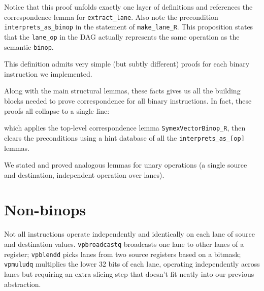 Notice that this proof unfolds exactly one layer of definitions and references the correspondence lemma for \texttt{extract_lane}. 
Also note the precondition \texttt{interprets_as_binop} in the statement of \texttt{make_lane_R}. This proposition states that the \texttt{lane_op} in the DAG actually represents the same operation as the semantic \texttt{binop}.


This definition admits very simple (but subtly different) proofs for each binary instruction we implemented.



Along with the main structural lemmas, these facts gives us all the building blocks needed to prove correspondence for all binary instructions. In fact, these proofs all collapse to a single line:


which applies the top-level correspondence lemma \texttt{SymexVectorBinop_R}, then clears the preconditions using a hint database of all the \texttt{interprets_as_[op]} lemmas.

We stated and proved analogous lemmas for unary operations (a single source and destination, independent operation over lanes).

\section{Non-binops}

Not all instructions operate independently and identically on each lane of source and destination values. \texttt{vpbroadcastq} broadcasts one lane to other lanes of a register; \texttt{vpblendd} picks lanes from two source registers based on a bitmask; \texttt{vpmuludq} multiplies the lower 32 bits of each lane, operating independently across lanes but requiring an extra slicing step that doesn't fit neatly into our previous abstraction.

